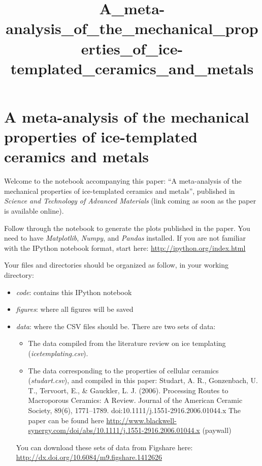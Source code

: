 \documentclass[11pt]{article}
\title{A\_meta-analysis\_of\_the\_mechanical\_properties\_of\_ice-templated\_ceramics\_and\_metals}
\providecommand{\tightlist}{%
      \setlength{\itemsep}{0pt}\setlength{\parskip}{0pt}}
\begin{document}
    
    
    \maketitle
    
    

    
    \hypertarget{a-meta-analysis-of-the-mechanical-properties-of-ice-templated-ceramics-and-metals}{%
\section{A meta-analysis of the mechanical properties of ice-templated
ceramics and
metals}\label{a-meta-analysis-of-the-mechanical-properties-of-ice-templated-ceramics-and-metals}}

Welcome to the notebook accompanying this paper: ``A meta-analysis of
the mechanical properties of ice-templated ceramics and metals'',
published in \emph{Science and Technology of Advanced Materials} (link
coming as soon as the paper is available online).

Follow through the notebook to generate the plots published in the
paper. You need to have \emph{Matplotlib}, \emph{Numpy}, and
\emph{Pandas} installed. If you are not familiar with the IPython
notebook format, start here: \url{http://ipython.org/index.html}

Your files and directories should be organized as follow, in your
working directory:

\begin{itemize}
\tightlist
\item
  \emph{code}: contains this IPython notebook
\item
  \emph{figures}: where all figures will be saved
\item
  \emph{data}: where the CSV files should be. There are two sets of
  data:

  \begin{itemize}
  \tightlist
  \item
    The data compiled from the literature review on ice templating
    (\emph{icetemplating.csv}).
  \item
    The data corresponding to the properties of cellular ceramics
    (\emph{studart.csv}), and compiled in this paper: Studart, A. R.,
    Gonzenbach, U. T., Tervoort, E., \& Gauckler, L. J. (2006).
    Processing Routes to Macroporous Ceramics: A Review. Journal of the
    American Ceramic Society, 89(6), 1771--1789.
    doi:10.1111/j.1551-2916.2006.01044.x The paper can be found here
    \url{http://www.blackwell-synergy.com/doi/abs/10.1111/j.1551-2916.2006.01044.x}
    (paywall)
  \end{itemize}

  You can download these sets of data from Figshare here:
  \url{http://dx.doi.org/10.6084/m9.figshare.1412626}
\end{itemize}
\end{document}
